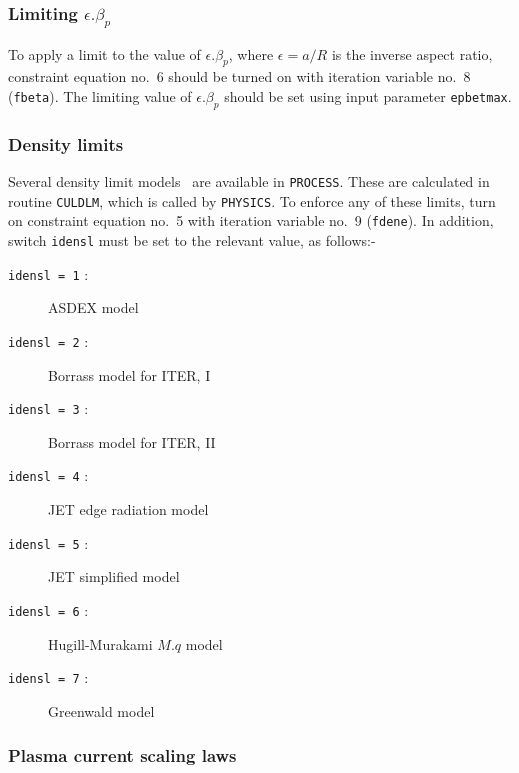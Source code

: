\documentclass[11pt,a4paper]{report}
\newcommand{\process}{\mbox{\texttt{PROCESS}}}
\begin{document}
\subsubsection*{Limiting $\epsilon.\beta_p$}

To apply a limit to the value of $\epsilon.\beta_p$, where $\epsilon = a/R$ is
the inverse aspect ratio, constraint equation no.\ 6 should be turned on with
iteration variable no.\ 8 (\texttt{fbeta}). The limiting value of
$\epsilon.\beta_p$ should be set using input parameter \texttt{epbetmax}.

\subsubsection{Density limits}

Several density limit models~\cite{172} are available in \process. These are
calculated in routine \texttt{CULDLM}, which is called by \texttt{PHYSICS}.
To enforce any of these limits, turn on constraint equation no.~5 with
iteration variable no.~9 (\texttt{fdene}).  In addition, switch
\texttt{idensl} must be set to the relevant value, as follows:-
\begin{description} %
\item [\texttt{idensl = 1} :] ASDEX model
\item [\texttt{idensl = 2} :] Borrass model for ITER, I
\item [\texttt{idensl = 3} :] Borrass model for ITER, II
\item [\texttt{idensl = 4} :] JET edge radiation model
\item [\texttt{idensl = 5} :] JET simplified model
\item [\texttt{idensl = 6} :] Hugill-Murakami $M.q$ model
\item [\texttt{idensl = 7} :] Greenwald model
\end{description}

\subsubsection{Plasma current scaling laws}
\label{sec:current_scaling}
\end{document}

